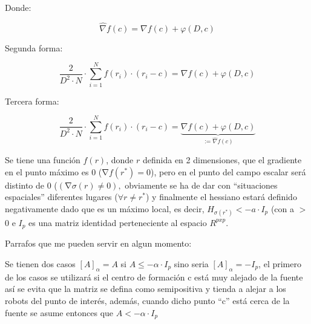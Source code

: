 Donde:

\begin{equation*}
	\hat{\nabla}{f}\left(c\right) = \nabla{f}\left(c\right) + \varphi\left(D,c\right)
\end{equation*}

Segunda forma:

\begin{equation*}
	\frac{2}{{D}^2\cdot{N}}\cdot\sum_{i=1}^{N}f(r_{i})\cdot(r_{i}-c)=\nabla{f}\left(c\right) + \varphi\left(D,c\right)
\end{equation*}


Tercera forma:

\begin{equation*}
	\frac{2}{{D}^2\cdot{N}}\cdot\sum_{i=1}^{N}f(r_{i})\cdot(r_{i}-c)=\underbrace{\nabla{f}\left(c\right) + \varphi\left(D,c\right)}_{:=\hat{\nabla}{f}\left(c\right)}
\end{equation*}


Se tiene una función $f\left(r\right)$, donde $r$ definida en 2 dimensiones, que el gradiente en el punto máximo es 0 ($\mathrm{\nabla }f\left(r^*\right)=0$), pero en el punto del campo escalar será distinto de 0 ($\left(\mathrm{\nabla }\sigma \left(r\right)\neq 0\right),$ obviamente se ha de dar con ``situaciones espaciales'' diferentes lugares ($\forall r\neq r^*$) y finalmente el hessiano estará definido negativamente dado que es un máximo local, es decir, $H_{\sigma (r^*)}<-a\cdot{I}_{p}$ (con a $\mathrm{>}$ 0 e $I_p$ es una matriz identidad perteneciente al espacio $R^{pxp}$.



Parrafos que me pueden servir en algun momento:


Se tienen dos casos ${\left[A\right]}_{\alpha }=A$ si $A\le -\alpha \cdot{I}_{p}$  sino seria  ${\left[A\right]}_{\alpha }=-I_p$, el primero de los casos se utilizará si el centro de formación c está muy alejado de la fuente así se evita que la matriz se defina como semipositiva y tienda a alejar a los robots del punto de interés, además, cuando dicho punto ``c'' está cerca de la fuente se asume entonces que $A<-\alpha \cdot{I}_{p}$

